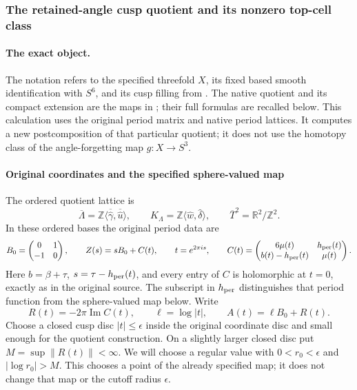 
\subsubsection{The retained-angle cusp quotient and its nonzero top-cell class}
\label{h24:ret:section}

\paragraph{The exact object.}
The notation refers to the specified threefold \(X\), its fixed based
smooth identification with \(S^6\), and its cusp filling from
\cite[\S\S3.7,4.1--4.5]{h24:retbib:Canonical}.  The native quotient and its compact
extension are the maps in \cite{h24:retbib:ConeRoutes}; their full formulas are
recalled below.  This calculation uses the original period matrix and
native period lattices.  It computes a new postcomposition of that
particular quotient; it does not use the homotopy class of the
angle-forgetting map \(g:X\to S^3\).

\paragraph{Original coordinates and the specified sphere-valued map}

The ordered quotient lattice is
\[
 \overline\Lambda=\mathbb Z\langle\overline{\widehat\gamma},
              \overline{\widehat u}\rangle,
 \qquad
 K_\Lambda=\mathbb Z\langle\widehat w,\widehat\delta\rangle,
 \qquad
 \overline T^2=\mathbb R^2/\mathbb Z^2.
\]
In these ordered bases the original period data are
\begin{equation}
 B_0=\begin{pmatrix}0&1\\-1&0\end{pmatrix},\qquad
 Z(s)=sB_0+C(t),\qquad t=e^{2\pi i s},\qquad
 C(t)=\begin{pmatrix}6\mu(t)&h_{\rm per}(t)\\
 b(t)-h_{\rm per}(t)&\mu(t)\end{pmatrix}.
 \label{h24:ret:eq:original-periods}
\end{equation}
Here \(b=\beta+\tau\), \(s=\tau-h_{\rm per}(t)\), and every entry of
\(C\) is holomorphic at \(t=0\), exactly as in the original source.
The subscript in \(h_{\rm per}\) distinguishes that period function
from the sphere-valued map below.  Write
\begin{equation}
 R(t)=-2\pi\operatorname{Im}C(t),\qquad
 \ell=\log|t|,\qquad A(t)=\ell B_0+R(t).
 \label{h24:ret:eq:A}
\end{equation}
Choose a closed cusp disc \(|t|\leq\epsilon\) inside the original
coordinate disc and small enough for the quotient construction.  On a
slightly larger closed disc put \(M=\sup\|R(t)\|<\infty\).  We will
choose a regular value with \(0<r_0<\epsilon\) and
\(|\log r_0|>M\).  This chooses a point of the already specified map;
it does not change that map or the cutoff radius \(\epsilon\).


